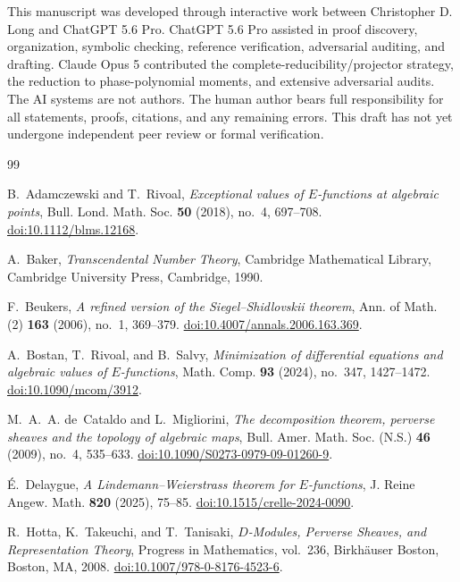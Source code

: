 \documentclass[11pt]{article}
\numberwithin{equation}{section}
\theoremstyle{definition}
\theoremstyle{remark}
\begin{document}
This manuscript was developed through interactive work between Christopher
D. Long and ChatGPT 5.6 Pro.  ChatGPT 5.6 Pro assisted in proof discovery,
organization, symbolic checking, reference verification, adversarial auditing,
and drafting.  Claude Opus 5 contributed the complete-reducibility/projector strategy,
the reduction to phase-polynomial moments, and extensive adversarial audits.
The AI systems are not authors.  The human author bears full responsibility
for all statements, proofs, citations, and any remaining errors.  This draft
has not yet undergone independent peer review or formal verification.

\small
\begin{thebibliography}{99}

B.~Adamczewski and T.~Rivoal,
\emph{Exceptional values of $E$-functions at algebraic points},
Bull. Lond. Math. Soc. \textbf{50} (2018), no.~4, 697--708.
\href{https://doi.org/10.1112/blms.12168}{doi:10.1112/blms.12168}.

A.~Baker,
\emph{Transcendental Number Theory},
Cambridge Mathematical Library,
Cambridge University Press, Cambridge, 1990.

F.~Beukers,
\emph{A refined version of the Siegel--Shidlovskii theorem},
Ann. of Math. (2) \textbf{163} (2006), no.~1, 369--379.
\href{https://doi.org/10.4007/annals.2006.163.369}{doi:10.4007/annals.2006.163.369}.

A.~Bostan, T.~Rivoal, and B.~Salvy,
\emph{Minimization of differential equations and algebraic values of
$E$-functions},
Math. Comp. \textbf{93} (2024), no.~347, 1427--1472.
\href{https://doi.org/10.1090/mcom/3912}{doi:10.1090/mcom/3912}.

M.~A.~A. de~Cataldo and L.~Migliorini,
\emph{The decomposition theorem, perverse sheaves and the topology of
algebraic maps},
Bull. Amer. Math. Soc. (N.S.) \textbf{46} (2009), no.~4, 535--633.
\href{https://doi.org/10.1090/S0273-0979-09-01260-9}{doi:10.1090/S0273-0979-09-01260-9}.

\'E.~Delaygue,
\emph{A Lindemann--Weierstrass theorem for $E$-functions},
J. Reine Angew. Math. \textbf{820} (2025), 75--85.
\href{https://doi.org/10.1515/crelle-2024-0090}{doi:10.1515/crelle-2024-0090}.

R.~Hotta, K.~Takeuchi, and T.~Tanisaki,
\emph{$D$-Modules, Perverse Sheaves, and Representation Theory},
Progress in Mathematics, vol.~236,
Birkh\"auser Boston, Boston, MA, 2008.
\href{https://doi.org/10.1007/978-0-8176-4523-6}{doi:10.1007/978-0-8176-4523-6}.


\end{thebibliography}
\end{document}
